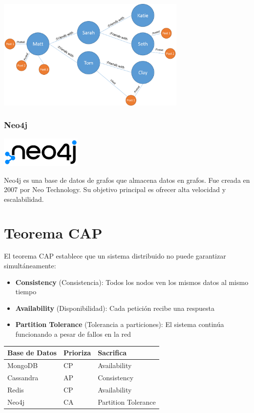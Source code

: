 \documentclass[12pt]{article}
\begin{document}
\begin{center}
\includegraphics[width=0.7\textwidth]{images/Neo4j_graph.png}
\end{center}

\subsubsection{Neo4j}

\begin{center}
  \includegraphics[width=0.3\textwidth]{images/Neo4j.png}
\end{center}

Neo4j es una base de datos de grafos que almacena datos en grafos. Fue creada en 2007 por Neo Technology. Su objetivo principal es ofrecer alta velocidad y escalabilidad.

\section{Teorema CAP}
El teorema CAP establece que un sistema distribuido no puede garantizar simultáneamente:

\begin{itemize}
    \item \textbf{Consistency} (Consistencia): Todos los nodos ven los mismos datos al mismo tiempo
    \item \textbf{Availability} (Disponibilidad): Cada petición recibe una respuesta
    \item \textbf{Partition Tolerance} (Tolerancia a particiones): El sistema continúa funcionando a pesar de fallos en la red
\end{itemize}

\begin{center}
\begin{tabular}{lll}
\toprule
Base de Datos & Prioriza & Sacrifica \\
\midrule
MongoDB & CP & Availability \\
Cassandra & AP & Consistency \\
Redis & CP & Availability \\
Neo4j & CA & Partition Tolerance \\
\bottomrule
\end{tabular}
\end{center}
\end{document}
